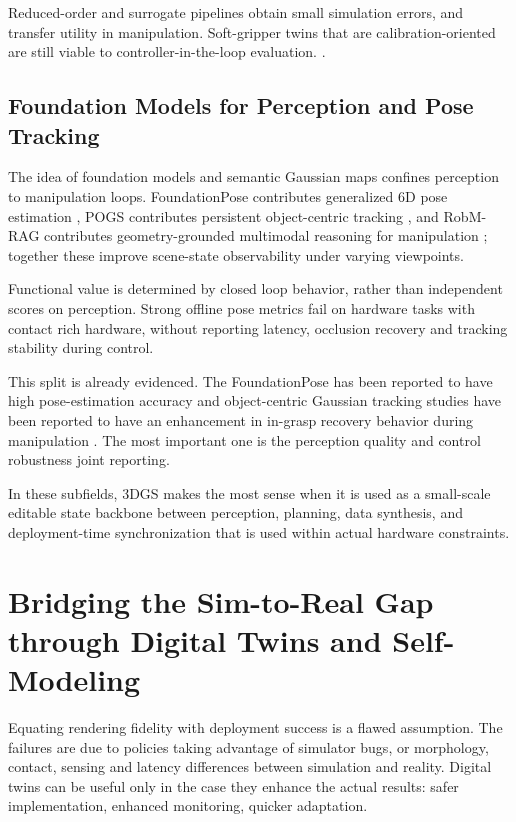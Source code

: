 \documentclass[11pt,a4paper]{article}
\begin{document}
Reduced-order and surrogate pipelines obtain small simulation errors, and transfer utility in manipulation. Soft-gripper twins that are calibration-oriented are still viable to controller-in-the-loop evaluation. \cite{yao2026generalized,hadi2021webots}.

\subsection{Foundation Models for Perception and Pose Tracking}

The idea of foundation models and semantic Gaussian maps confines perception to manipulation loops. FoundationPose contributes generalized 6D pose estimation \cite{wen2024foundationpose}, POGS contributes persistent object-centric tracking \cite{lin2025pogs}, and RobM-RAG contributes geometry-grounded multimodal reasoning for manipulation \cite{xie2025robmrag}; together these improve scene-state observability under varying viewpoints.

Functional value is determined by closed loop behavior, rather than independent scores on perception. Strong offline pose metrics fail on hardware tasks with contact rich hardware, without reporting latency, occlusion recovery and tracking stability during control.

This split is already evidenced. The FoundationPose has been reported to have high pose-estimation accuracy and object-centric Gaussian tracking studies have been reported to have an enhancement in in-grasp recovery behavior during manipulation \cite{wen2024foundationpose,lin2025pogs}. The most important one is the perception quality and control robustness joint reporting.

In these subfields, 3DGS makes the most sense when it is used as a small-scale editable state backbone between perception, planning, data synthesis, and deployment-time synchronization that is used within actual hardware constraints.


\section{Bridging the Sim-to-Real Gap through Digital Twins and Self-Modeling}
\label{sec:sim2real}

Equating rendering fidelity with deployment success is a flawed assumption. The failures are due to policies taking advantage of simulator bugs, or morphology, contact, sensing and latency differences between simulation and reality. Digital twins can be useful only in the case they enhance the actual results: safer implementation, enhanced monitoring, quicker adaptation.
\end{document}
